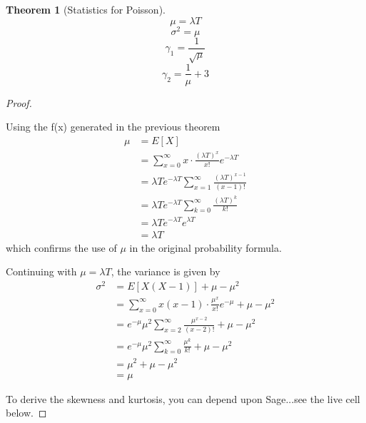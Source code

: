 \documentclass[10pt,]{book}
\theoremstyle{plain}
\newtheorem{theorem}{Theorem}[section]
\theoremstyle{definition}
\theoremstyle{definition}
\theoremstyle{definition}
\numberwithin{equation}{section}
\begin{document}
\begin{theorem}[{Statistics for Poisson}]\label{theorem-47}
\begin{equation*}\mu = \lambda T\end{equation*}\begin{equation*}\sigma^2 = \mu\end{equation*}\begin{equation*}\gamma_1 = \frac{1}{\sqrt{\mu}}\end{equation*}\begin{equation*}\gamma_2 = \frac{1}{\mu}+3\end{equation*}\end{theorem}
\begin{proof}\hypertarget{proof-46}{}
 Using the f(x) generated in the previous theorem
\begin{align*}
\mu & = E[X] \\
 & = \sum_{x=0}^{\infty} x \cdot \frac{(\lambda T)^x}{x!} e^{-\lambda T}\\
 & = \lambda T e^{-\lambda T} \sum_{x=1}^{\infty} \frac{(\lambda T)^{x-1}}{(x-1)!} \\
 & = \lambda T e^{-\lambda T} \sum_{k=0}^{\infty} \frac{(\lambda T)^k}{k!} \\
 & = \lambda T e^{-\lambda T} e^{\lambda T} \\
 & = \lambda T 
\end{align*}
which confirms the use of \(\mu\) in the original probability formula.
%
\par

Continuing with \(\mu = \lambda T\), the variance is given by
\begin{align*}
\sigma^2 & = E[X(X-1)] + \mu - \mu^2 \\
 & = \sum_{x=0}^{\infty} x(x-1) \cdot \frac{\mu^x}{x!} e^{-\mu} + \mu - \mu^2\\
 & = e^{-\mu} \mu^2 \sum_{x=2}^{\infty} \frac{\mu^{x-2}}{(x-2)!} + \mu - \mu^2\\
 & = e^{-\mu} \mu^2 \sum_{k=0}^{\infty} \frac{\mu^k}{k!} + \mu - \mu^2\\
 & = \mu^2 + \mu - \mu^2 \\
 & = \mu
\end{align*}

To derive the skewness and kurtosis, you can depend upon Sage...see the live cell below.
%
\end{proof}
\end{document}

